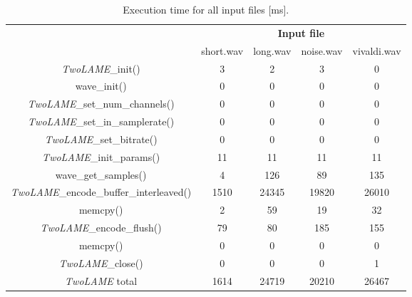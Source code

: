 \documentclass{article}
\begin{document}
\begin{table}[H]
    \centering
    \begin{tabular}{c|c|c|c|c|}
    \cline{2-5}
    \multicolumn{1}{c|}{}  & \multicolumn{4}{c|}{\textbf{Input file}} \\
    \cline{2-5}
     & short.wav & long.wav & noise.wav & vivaldi.wav \\
    \hline
    \multicolumn{1}{|c|}{\textit{TwoLAME}\_init()}  & 3 & 2 & 3 & 0 \\ 
    \hline
    \multicolumn{1}{|c|}{wave\_init()}  & 0 & 0 & 0 & 0 \\ 
    \hline
    \multicolumn{1}{|c|}{\textit{TwoLAME}\_set\_num\_channels()}   & 0 & 0 & 0 & 0 \\ 
    \hline
    \multicolumn{1}{|c|}{\textit{TwoLAME}\_set\_in\_samplerate()}   & 0 & 0 & 0 & 0 \\ 
    \hline
    \multicolumn{1}{|c|}{\textit{TwoLAME}\_set\_bitrate()}   & 0 & 0 & 0 & 0 \\ 
    \hline
    \multicolumn{1}{|c|}{\textit{TwoLAME}\_init\_params()}   & 11 & 11 & 11 & 11 \\ 
    \hline
    \multicolumn{1}{|c|}{wave\_get\_samples()}   & 4 & 126 & 89 & 135 \\ 
    \hline
    \multicolumn{1}{|c|}{\textit{TwoLAME}\_encode\_buffer\_interleaved()}   & 1510 & 24345 & 19820 & 26010 \\ 
    \hline
    \multicolumn{1}{|c|}{memcpy()}  & 2 & 59 & 19 & 32 \\ 
    \hline
    \multicolumn{1}{|c|}{\textit{TwoLAME}\_encode\_flush()}   & 79 & 80 & 185 & 155 \\ 
    \hline
    \multicolumn{1}{|c|}{memcpy()}  & 0 & 0 & 0 & 0 \\ 
    \hline
    \multicolumn{1}{|c|}{\textit{TwoLAME}\_close()}   & 0 & 0 & 0 & 1 \\ 
    \hline
    \multicolumn{1}{|c|}{\textit{TwoLAME} total}  & 1614 & 24719 & 20210 & 26467 \\ 
    \hline
    \end{tabular}
    \caption{Execution time for all input files [ms].}
    \label{profiling1}
\end{table}

\vspace{1cm}
\end{document}
